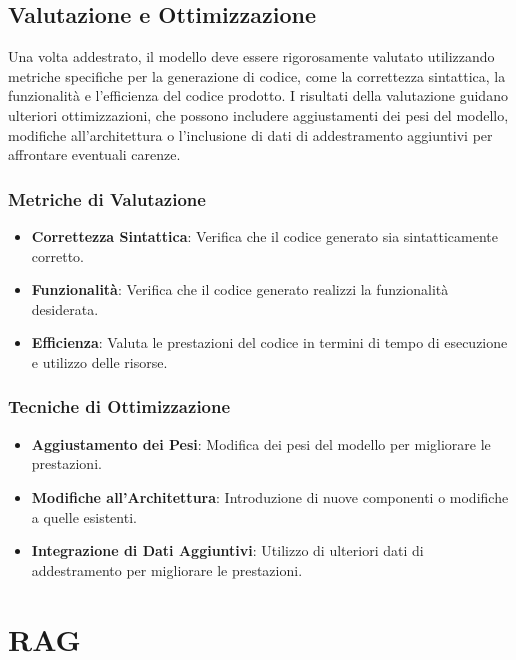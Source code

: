 \documentclass[12pt,a4paper,openright,twoside]{book}
\begin{document}
\section{Valutazione e Ottimizzazione}
Una volta addestrato, il modello deve essere rigorosamente valutato utilizzando metriche specifiche per la generazione di codice, come la correttezza sintattica, la funzionalità e l'efficienza del codice prodotto. I risultati della valutazione guidano ulteriori ottimizzazioni, che possono includere aggiustamenti dei pesi del modello, modifiche all'architettura o l'inclusione di dati di addestramento aggiuntivi per affrontare eventuali carenze.

\subsection{Metriche di Valutazione}
\begin{itemize}
    \item \textbf{Correttezza Sintattica}: Verifica che il codice generato sia sintatticamente corretto.
    \item \textbf{Funzionalità}: Verifica che il codice generato realizzi la funzionalità desiderata.
    \item \textbf{Efficienza}: Valuta le prestazioni del codice in termini di tempo di esecuzione e utilizzo delle risorse.
\end{itemize}

\subsection{Tecniche di Ottimizzazione}
\begin{itemize}
    \item \textbf{Aggiustamento dei Pesi}: Modifica dei pesi del modello per migliorare le prestazioni.
    \item \textbf{Modifiche all'Architettura}: Introduzione di nuove componenti o modifiche a quelle esistenti.
    \item \textbf{Integrazione di Dati Aggiuntivi}: Utilizzo di ulteriori dati di addestramento per migliorare le prestazioni.
\end{itemize}

\chapter{RAG}
\end{document}
